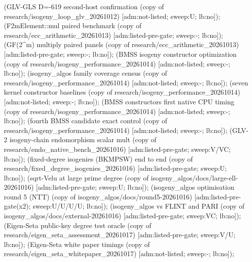 (GLV-GLS D=-619 second-host confirmation (copy of research/\allowbreak{}isogeny\_\allowbreak{}loop\_\allowbreak{}glv\_\allowbreak{}20261012) [adm:not-listed; sweep:U; lb:no]);  (F2mElement::mul paired benchmark (copy of research/\allowbreak{}ecc\_\allowbreak{}arithmetic\_\allowbreak{}20261013) [adm:listed-pre-gate; sweep:-; lb:no]);  (GF(2\textasciicircum{}m) multiply paired panels (copy of research/\allowbreak{}ecc\_\allowbreak{}arithmetic\_\allowbreak{}20261013) [adm:listed-pre-gate; sweep:-; lb:no]);  (BMSS isogeny constructor optimization (copy of research/\allowbreak{}isogeny\_\allowbreak{}performance\_\allowbreak{}20261014) [adm:not-listed; sweep:-; lb:no]);  (isogeny\_\allowbreak{}algos family coverage census (copy of research/\allowbreak{}isogeny\_\allowbreak{}performance\_\allowbreak{}20261014) [adm:not-listed; sweep:-; lb:no]);  (seven kernel constructor baselines (copy of research/\allowbreak{}isogeny\_\allowbreak{}performance\_\allowbreak{}20261014) [adm:not-listed; sweep:-; lb:no]);  (BMSS constructors first native CPU timing (copy of research/\allowbreak{}isogeny\_\allowbreak{}performance\_\allowbreak{}20261014) [adm:not-listed; sweep:-; lb:no]);  (fourth BMSS candidate exact control (copy of research/\allowbreak{}isogeny\_\allowbreak{}performance\_\allowbreak{}20261014) [adm:not-listed; sweep:-; lb:no]);  (GLV-2 isogeny-chain endomorphism scalar mult (copy of research/\allowbreak{}endo\_\allowbreak{}native\_\allowbreak{}bench\_\allowbreak{}20261016) [adm:listed-pre-gate; sweep:V/\allowbreak{}VC; lb:no]);  (fixed-degree isogenies (BKMPSW) end to end (copy of research/\allowbreak{}fixed\_\allowbreak{}degree\_\allowbreak{}isogenies\_\allowbreak{}20261016) [adm:listed-pre-gate; sweep:U; lb:no]);  (sqrt-Velu at large prime degree (copy of isogeny\_\allowbreak{}algos/\allowbreak{}docs/\allowbreak{}large-ell-20261016) [adm:listed-pre-gate; sweep:U; lb:no]);  (isogeny\_\allowbreak{}algos optimisation round 5 (NTT) (copy of isogeny\_\allowbreak{}algos/\allowbreak{}docs/\allowbreak{}round5-20261016) [adm:listed-pre-gate(x2); sweep:U/\allowbreak{}U/\allowbreak{}U/\allowbreak{}U; lb:no]);  (isogeny\_\allowbreak{}algos vs FLINT and PARI (copy of isogeny\_\allowbreak{}algos/\allowbreak{}docs/\allowbreak{}external-20261016) [adm:listed-pre-gate; sweep:VC; lb:no]);  (Eigen-Seta public-key degree test oracle (copy of research/\allowbreak{}eigen\_\allowbreak{}seta\_\allowbreak{}assessment\_\allowbreak{}20261017) [adm:listed-pre-gate; sweep:V/\allowbreak{}U; lb:no]);  (Eigen-Seta white paper timings (copy of research/\allowbreak{}eigen\_\allowbreak{}seta\_\allowbreak{}whitepaper\_\allowbreak{}20261017) [adm:not-listed; sweep:-; lb:no]); 